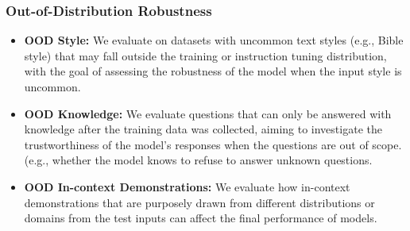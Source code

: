 \subsubsection*{Out-of-Distribution Robustness}
    \begin{itemize}
        \item \textbf{OOD Style:} We evaluate on datasets with uncommon text styles (e.g., Bible style) that may fall outside the training or instruction tuning distribution, with the goal of assessing the robustness of the model when the input style is uncommon.
        \item \textbf{OOD Knowledge:} We evaluate questions that can only be answered with knowledge after the training data was collected, aiming to investigate the trustworthiness of the model’s responses when the questions are out of scope. (e.g., whether the model knows to refuse to answer unknown questions.
        \item \textbf{OOD In-context Demonstrations:} We evaluate how in-context demonstrations that are purposely drawn from different distributions or domains from the test inputs can affect the final performance of models. 
    \end{itemize}